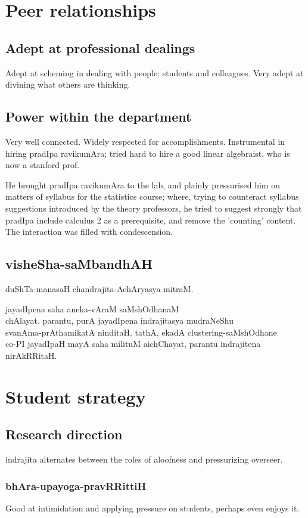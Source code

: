 \documentclass[oneside, article]{memoir}
\begin{document}
\section{Peer relationships}
\subsection{Adept at professional dealings}
Adept at scheming in dealing with people: students and colleagues. Very adept at divining what others are thinking.

\subsection{Power within the department}
Very well connected. Widely respected for accomplishments. Instrumental in hiring pradIpa ravikumAra; tried hard to hire a good linear algebraist, who is now a stanford prof.

He brought pradIpa ravikumAra to the lab, and plainly pressurised him on matters of syllabus for the statistics course; where, trying to counteract syllabus suggestions introduced by the theory professors, he tried to suggest strongly that pradIpa include calculus 2 as a prerequisite, and remove the 'counting' content. The interaction was filled with condescension.

\subsection{visheSha-saMbandhAH}
duShTa-manasaH chandrajita-AchAryasya mitraM.

jayadIpena saha aneka-vAraM saMshOdhanaM \\chAlayat. parantu, purA jayadIpena indrajitasya mudraNeShu \\svanAma-prAthamikatA ninditaH. tathA, ekadA clustering-saMshOdhane \\
co-PI jayadIpaH mayA saha milituM aichChayat, parantu indrajitena nirAkRRitaH.

\section{Student strategy}
\subsection{Research direction}
indrajita alternates between the roles of aloofness and pressurizing overseer.

\subsubsection{bhAra-upayoga-pravRRittiH}
Good at intimidation and applying pressure on students, perhaps even enjoys it.
\end{document}

